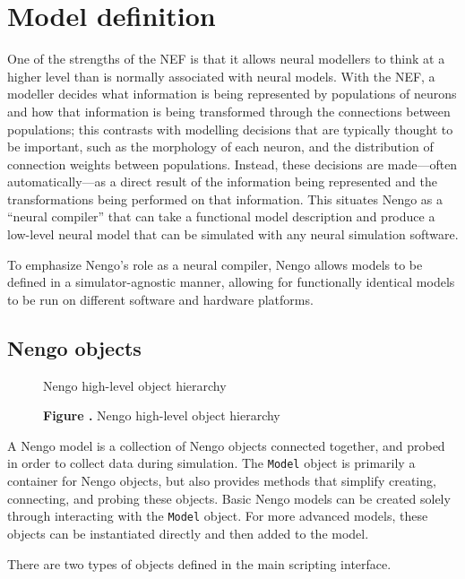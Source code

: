 \documentclass{frontiersSCNS}
\begin{document}
\section{Model definition}

One of the strengths of the NEF
is that it allows neural modellers to think
at a higher level
than is normally associated with neural models.
With the NEF, a modeller decides
what information is being represented
by populations of neurons and how that information
is being transformed through the connections
between populations;
this contrasts with modelling decisions
that are typically thought to be important,
such as the morphology of each neuron,
and the distribution of connection weights
between populations.
Instead, these decisions are made---often
automatically---as a direct result
of the information
being represented and the transformations
being performed on that information.
This situates Nengo as a
``neural compiler'' that can
take a functional model description
and produce a low-level neural model
that can be simulated
with any neural simulation software.

To emphasize Nengo's role as a neural compiler,
Nengo allows models to be defined
in a simulator-agnostic manner,
allowing for functionally identical models to be run
on different software and hardware platforms.

\subsection{Nengo objects} \label{sec:objects}

\begin{figure}
\begin{center}
  Nengo high-level object hierarchy
\end{center}
 \textbf{\label{fig:01} Figure .}{
   Nengo high-level object hierarchy}
\end{figure}

A Nengo model is a collection
of Nengo objects connected together,
and probed in order to collect data
during simulation.
The \texttt{Model} object is primarily a container
for Nengo objects,
but also provides methods
that simplify creating, connecting,
and probing these objects.
Basic Nengo models
can be created solely through interacting
with the \texttt{Model} object.
For more advanced models,
these objects can be instantiated
directly and then added to the model.

There are two types of objects
defined in the main scripting interface.
\end{document}
